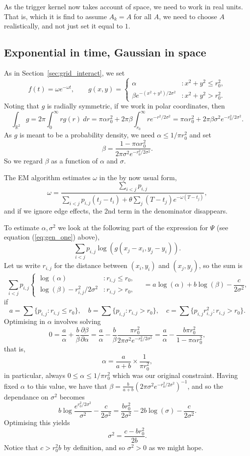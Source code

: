 \documentclass[twoside,a4paper]{article}
\theoremstyle{plain}
\theoremstyle{definition}
\begin{document}
As the trigger kernel now takes account of space, we need to work in real units.  That is,
which it is find to assume $A_k=A$ for all $A$, we need to choose $A$ realistically, and
not just set it equal to $1$.


\subsection{Exponential in time, Gaussian in space}

As in Section~\ref{sec:grid_interact}, we set
\[ f(t) = \omega e^{-\omega t}, \qquad
g(x,y) = \begin{cases} \alpha &: x^2+y^2\leq r_0^2, \\
\beta e^{-(x^2+y^2)/2\sigma^2} &: x^2+y^2 > r_0^2. \end{cases} \]
Noting that $g$ is radially symmetric, if we work in polar coordinates, then
\[ \int_{\mathbb R^2} g = 2\pi\int_0^\infty r g(r) \ dr
= \pi\alpha r_0^2 + 2\pi\beta\int_{r_0}^\infty r e^{-r^2/2\sigma^2}
= \pi\alpha r_0^2 + 2\pi\beta\sigma^2 e^{-r_0^2/2\sigma^2}. \]
As $g$ is meant to be a probability density, we need $\alpha \leq 1/ \pi r_0^2$ and
set
\[ \beta = \frac{1 - \pi\alpha r_0^2}{2\pi\sigma^2 e^{-r_0^2/2\sigma^2}}. \]
So we regard $\beta$ as a function of $\alpha$ and $\sigma$.

The EM algorithm estimates $\omega$ in the by now usual form,
\[ \omega = \frac{\sum_{i<j} p_{i,j}}{\sum_{i<j} p_{i,j} (t_j-t_i) +
\theta \sum_j (T-t_j) e^{-\omega(T-t_j)}}, \]
and if we ignore edge effects, the 2nd term in the denominator disappears.

To estimate $\alpha,\sigma^2$ we look at the following part of the expression for $\Psi$
(see equation (\ref{eq:gen_one}) above),
\[ \sum_{i<j} p_{i,j} \log(g(x_j-x_i, y_j-y_i)). \]
Let us write $r_{i,j}$ for the distance between $(x_i,y_i)$ and $(x_j,y_j)$, so the sum is
\[ \sum_{i<j} p_{i,j} \begin{cases} \log(\alpha) &: r_{i,j}\leq r_0, \\
\log(\beta) - r_{i,j}^2/2\sigma^2 &: r_{i,j} > r_0, \end{cases}
\quad = a\log(\alpha) + b\log(\beta) - \frac{c}{2\sigma^2}, \]
if
\[ a = \sum \big\{ p_{i,j} : r_{i,j}\leq r_0 \big\}, \quad
b = \sum \big\{ p_{i,j} : r_{i,j} > r_0 \big\}, \quad
c = \sum \big\{ p_{i,j}r_{i,j}^2 : r_{i,j} > r_0 \big\}. \]
Optimising in $\alpha$ involves solving
\[ 0 = \frac{a}{\alpha} + \frac{b}{\beta} \frac{\partial \beta}{\partial \alpha}
= \frac{a}{\alpha} - \frac{b}{\beta} \frac{\pi r_0^2}{2\pi\sigma^2 e^{-r_0^2/2\sigma^2}}
= \frac{a}{\alpha} - \frac{b\pi r_0^2}{1-\pi\alpha r_0^2}, \]
that is,
\[ \alpha = \frac{a}{a+b} \times \frac{1}{\pi r_0^2}, \]
in particular, always $0 \leq \alpha \leq 1 / \pi r_0^2$ which was our original constraint.
Having fixed $\alpha$ to this value, we have that $\beta = \frac{b}{a+b}
(2\pi\sigma^2e^{-r_0^2/2\sigma^2})^{-1}$, and so the dependance on $\sigma^2$ becomes
\[ b \log\frac{e^{r_0^2/2\sigma^2}}{\sigma^2} - \frac{c}{2\sigma^2}
= \frac{b r_0^2}{2\sigma^2} - 2b\log(\sigma) - \frac{c}{2\sigma^2}. \]
Optimising this yields
\[ \sigma^2 = \frac{c - br_0^2}{2b}. \]
Notice that $c > r_0^2 b$ by definition, and so $\sigma^2>0$ as we might hope.
\end{document}
